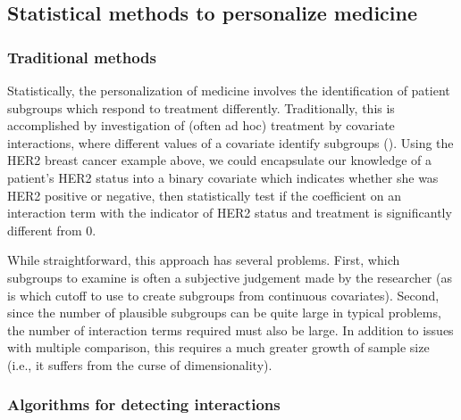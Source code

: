 \documentclass[12pt]{article}
\begin{document}

\subsection{Statistical methods to personalize medicine} %
\label{sub:statistical_methods_to_personalize_medicine}


\subsubsection{Traditional methods} %
\label{ssub:traditional_methods}


Statistically, the personalization of medicine involves the identification of patient subgroups which respond to treatment differently. Traditionally, this is accomplished by investigation of (often ad hoc) treatment by covariate interactions, where different values of a covariate identify subgroups (\cite{Byar1985}). Using the HER2 breast cancer example above, we could encapsulate our knowledge of a patient's HER2 status into a binary covariate which indicates whether she was HER2 positive or negative, then statistically test if the coefficient on an interaction term with the indicator of HER2 status and treatment is significantly different from 0.


While straightforward, this approach has several problems. First, which subgroups to examine is often a subjective judgement made by the researcher (as is which cutoff to use to create subgroups from continuous covariates). Second, since the number of plausible subgroups can be quite large in typical problems, the number of interaction terms required must also be large. In addition to issues with multiple comparison, this requires a much greater growth of sample size (i.e., it suffers from the curse of dimensionality).

\subsubsection{Algorithms for detecting interactions} %
\label{ssub:algorithms_for_detecting_interactions}
\end{document}
